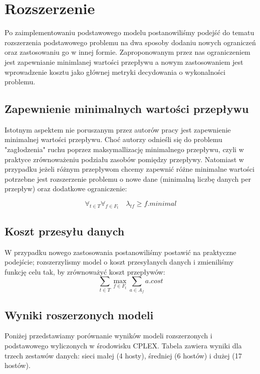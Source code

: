 \section{Rozszerzenie}

Po zaimplementowaniu podstawowego modelu postanowiliśmy podejść do tematu
rozszerzenia podstawowego problemu na dwa sposoby dodaniu nowych ograniczeń
oraz zastosowaniu go w innej formie. Zaproponowanym przez nas ograniczeniem jest
zapewnianie minimlanej wartości przepływu a nowym zastosowaniem jest wprowadzenie
kosztu jako głównej metryki decydowania o wykonalności problemu.

\subsection{Zapewnienie minimalnych wartości przepływu}

Istotnym aspektem nie poruszanym przez autorów pracy jest zapewnienie
minimalnej wartości przepływu. Choć autorzy odnieśli się do problemu "zagłodzenia"
ruchu poprzez maksymallizację minimalnego przepływu, czyli w praktyce zrównoważeniu
podziału zasobów pomiędzy przepływy. Natomiast w przypadku jeżeli różnym przepływom
chcemy zapewnić różne minimalne wartości potrzebne jest rozszerzenie problemu o
nowe dane (minimalną liczbę danych per przepływ) oraz dodatkowe ograniczenie:

\begin{equation}
  \forall_{t \in T} \forall_{f \in F_t} \quad \lambda_{tf} \ge f.minimal
\end{equation}

\subsection{Koszt przesyłu danych}

W przypadku nowego zastosowania postanowiliśmy postawić na praktyczne podejście;
rozszerzylismy model o koszt przesyłanych danych i zmieniliśmy funkcję celu tak,
by zrównoważyć koszt przepływów:
\begin{equation}
  \sum_{t \in T} \max_{f \in F_t} \sum_{a \in A_f} a.cost
\end{equation}

\subsection{Wyniki roszerzonych modeli}
Poniżej przedstawiamy porównanie wyników modeli rozszerzonych i podstawowego wyliczonych
w środowisku CPLEX. Tabela zawiera wyniki dla trzech zestawów danych: sieci małej (4 hosty),
średniej (6 hostów) i dużej (17 hostów).

